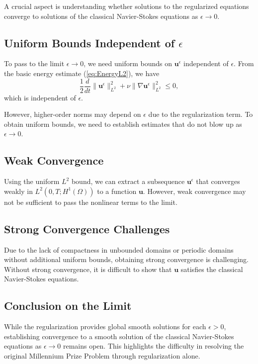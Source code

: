 \documentclass[11pt]{article}
\begin{document}
A crucial aspect is understanding whether solutions to the regularized equations converge to solutions of the classical Navier-Stokes equations as $\epsilon \to 0$.

\subsection{Uniform Bounds Independent of $\epsilon$}

To pass to the limit $\epsilon \to 0$, we need uniform bounds on $\mathbf{u}^\epsilon$ independent of $\epsilon$. From the basic energy estimate (\ref{eq:EnergyL2}), we have
\begin{equation}
\frac{1}{2} \frac{d}{dt} \| \mathbf{u}^\epsilon \|_{L^2}^2 + \nu \| \nabla \mathbf{u}^\epsilon \|_{L^2}^2 \leq 0,
\end{equation}
which is independent of $\epsilon$.

However, higher-order norms may depend on $\epsilon$ due to the regularization term. To obtain uniform bounds, we need to establish estimates that do not blow up as $\epsilon \to 0$.

\subsection{Weak Convergence}

Using the uniform $L^2$ bound, we can extract a subsequence $\mathbf{u}^\epsilon$ that converges weakly in $L^2(0, T; H^1(\Omega))$ to a function $\mathbf{u}$. However, weak convergence may not be sufficient to pass the nonlinear terms to the limit.

\subsection{Strong Convergence Challenges}

Due to the lack of compactness in unbounded domains or periodic domains without additional uniform bounds, obtaining strong convergence is challenging. Without strong convergence, it is difficult to show that $\mathbf{u}$ satisfies the classical Navier-Stokes equations.

\subsection{Conclusion on the Limit}

While the regularization provides global smooth solutions for each $\epsilon > 0$, establishing convergence to a smooth solution of the classical Navier-Stokes equations as $\epsilon \to 0$ remains open. This highlights the difficulty in resolving the original Millennium Prize Problem through regularization alone.
\end{document}
